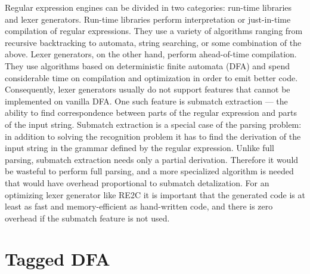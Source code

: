 \documentclass[preprint,12pt, a4paper]{elsarticle}
\begin{document}

\noindent
Regular expression engines can be divided in two categories: run-time libraries and lexer generators.
Run-time libraries perform interpretation or just-in-time compilation of regular expressions.
They use a variety of algorithms ranging from recursive backtracking to automata, string searching, or some combination of the above.
Lexer generators, on the other hand, perform ahead-of-time compilation.
They use algorithms based on deterministic finite automata (DFA) and spend considerable time on compilation and optimization in order to emit better code.
Consequently, lexer generators usually do not support features that cannot be implemented on vanilla DFA.
One such feature is submatch extraction --- the ability to find correspondence between parts of the regular expression and parts of the input string.
Submatch extraction is a special case of the parsing problem:
in addition to solving the recognition problem it has to find the derivation of the input string in the grammar defined by the regular expression.
Unlike full parsing, submatch extraction needs only a partial derivation. %
Therefore it would be wasteful to perform full parsing,
and a more specialized algorithm is needed that would have overhead proportional to submatch detalization.
For an optimizing lexer generator like RE2C \cite{RE2C} \cite{RE2Cx} it is important that the generated code is at least as fast and memory-efficient as hand-written code,
and there is zero overhead if the submatch feature is not used.

\section{Tagged DFA}
\end{document}
